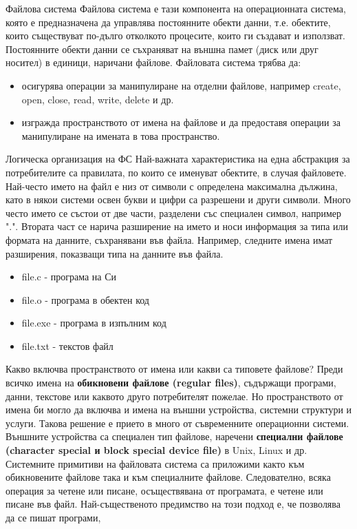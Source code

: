 \documentclass{article}
\begin{document}
Файлова система
Файлова система е тази компонента на операционната система, която е предназначена да управлява постоянните
обекти данни, т.е. обектите, които съществуват по-дълго отколкото процесите, които ги създават и използват.
Постоянните обекти данни се съхраняват на външна памет (диск или друг носител) в единици, наричани файлове.
Файловата система трябва да:
\begin{itemize}
    \item осигурява операции за манипулиране на отделни файлове, например create, open, close, read, write, delete и др.
    \item изгражда пространството от имена на файлове и да предоставя операции за манипулиране на имената в това пространство.
\end{itemize}
Логическа организация на ФС
Най-важната характеристика на една абстракция за потребителите са правилата, по които се именуват обектите,
в случая файловете. Най-често името на файл е низ от символи с определена максимална дължина, като в някои
системи освен букви и цифри са разрешени и други символи. Много често името се състои от две части, разделени
със специален символ, например ".". Втората част се нарича разширение на името и носи информация за типа
или формата на данните, съхранявани във файла. Например, следните имена имат разширения, показващи типа на
данните във файла.
\begin{itemize}
    \item file.c - програма на Си
    \item file.o - програма в обектен код
    \item file.exe - програма в изпълним код
    \item file.txt - текстов файл
\end{itemize}
Какво включва пространството от имена или какви са типовете файлове? Преди всичко имена на \textbf{обикновени файлове
(regular files)}, съдържащи програми, данни, текстове или каквото друго потребителят пожелае.
Но пространството от имена би могло да включва и имена на външни устройства, системни структури и услуги.
Такова решение е прието в много от съвременните операционни системи. Външните устройства са специален тип
файлове, наречени \textbf{специални файлове (character special и block special device file)} в Unix, Linux и др.
Системните примитиви на файловата система са приложими както към обикновените файлове така и към
специалните файлове. Следователно, всяка операция за четене или писане, осъществявана от програмата, е
четене или писане във файл. Най-същественото предимство на този подход е, че позволява да се пишат програми,
\end{document}
